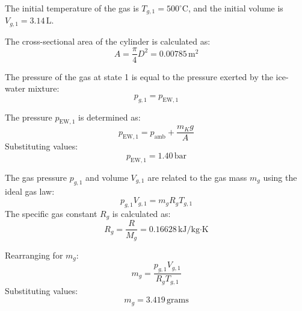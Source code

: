 The initial temperature of the gas is \( T_{g,1} = 500^\circ\text{C} \), and the initial volume is \( V_{g,1} = 3.14 \, \text{L} \).  

The cross-sectional area of the cylinder is calculated as:  
\[
A = \frac{\pi}{4} D^2 = 0.00785 \, \text{m}^2
\]  

The pressure of the gas at state 1 is equal to the pressure exerted by the ice-water mixture:  
\[
p_{g,1} = p_{\text{EW},1}
\]  

The pressure \( p_{\text{EW},1} \) is determined as:  
\[
p_{\text{EW},1} = p_{\text{amb}} + \frac{m_K g}{A}
\]  
Substituting values:  
\[
p_{\text{EW},1} = 1.40 \, \text{bar}
\]  

The gas pressure \( p_{g,1} \) and volume \( V_{g,1} \) are related to the gas mass \( m_g \) using the ideal gas law:  
\[
p_{g,1} V_{g,1} = m_g R_g T_{g,1}
\]  
The specific gas constant \( R_g \) is calculated as:  
\[
R_g = \frac{R}{M_g} = 0.16628 \, \text{kJ/kg·K}
\]  

Rearranging for \( m_g \):  
\[
m_g = \frac{p_{g,1} V_{g,1}}{R_g T_{g,1}}
\]  
Substituting values:  
\[
m_g = 3.419 \, \text{grams}
\]